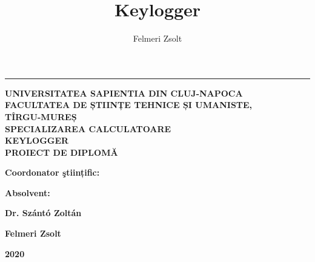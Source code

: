 \documentclass{article}
\title{Keylogger}
\author{Felmeri Zsolt}
\date{}
\begin{document}
 
\begin{titlepage}
\rule[10pt]{\textwidth}{1pt}
\begin{centering}
\vspace{4pt}
{\fontsize{18pt}{1} \textbf{UNIVERSITATEA SAPIENTIA DIN CLUJ-NAPOCA}}\\ \vspace{4pt}
{\fontsize{16pt}{1} \textbf{FACULTATEA DE ȘTIINȚE TEHNICE ȘI UMANISTE,\\
TÎRGU-MUREȘ\\
SPECIALIZAREA CALCULATOARE}}\\
\vspace{10em}
{\fontsize{28pt}{1} \textbf{KEYLOGGER}} \\
\vspace{10em}
{\fontsize{24pt}{1} \textbf{PROIECT DE DIPLOMĂ}}\\
\end{centering}

\vspace{15em}
\begin{noindent}
{\fontsize{16pt}{1} \textbf{Coordonator ştiințific:}}
\begin{hfill}
{\fontsize{16pt}{1} \textbf{Absolvent:}}
\end{hfill}
\end{noindent}

\begin{noindent}
\hspace{2.5em}
{\fontsize{14pt}{1} \textbf{Dr. Szántó Zoltán}}
\begin{hfill}
{\fontsize{14pt}{1} \textbf{Felmeri Zsolt}}
\end{hfill}
\end{noindent}

\vspace{5em}
\centering
{\fontsize{28pt}{1} \textbf{2020}}



\end{titlepage}
\end{document}
